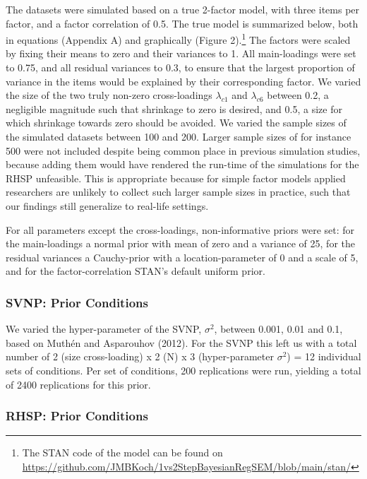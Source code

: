 \documentclass[
  man, donotrepeattitle,floatsintext]{apa6}
\begin{document}
The datasets were simulated based on a true 2-factor model, with three items per factor, and a factor correlation of 0.5. The true model is summarized below, both in equations (Appendix A) and graphically (Figure 2).\footnote{The STAN code of the model can be found on \url{https://github.com/JMBKoch/1vs2StepBayesianRegSEM/blob/main/stan/}} The factors were scaled by fixing their means to zero and their variances to 1. All main-loadings were set to 0.75, and all residual variances to 0.3, to ensure that the largest proportion of variance in the items would be explained by their corresponding factor. We varied the size of the two truly non-zero cross-loadings \(\lambda_{c 1}\) and \(\lambda_{c 6}\) between 0.2, a negligible magnitude such that shrinkage to zero is desired, and 0.5, a size for which shrinkage towards zero should be avoided. We varied the sample sizes of the simulated datasets between 100 and 200. Larger sample sizes of for instance 500 were not included despite being common place in previous simulation studies, because adding them would have rendered the run-time of the simulations for the RHSP unfeasible. This is appropriate because for simple factor models applied researchers are unlikely to collect such larger sample sizes in practice, such that our findings still generalize to real-life settings.

For all parameters except the cross-loadings, non-informative priors were set: for the main-loadings a normal prior with mean of zero and a variance of 25, for the residual variances a Cauchy-prior with a location-parameter of 0 and a scale of 5, and for the factor-correlation STAN's default uniform prior.

\hypertarget{svnp-prior-conditions}{%
\subsubsection{SVNP: Prior Conditions}\label{svnp-prior-conditions}}

We varied the hyper-parameter of the SVNP, \(\sigma^2\), between 0.001, 0.01 and 0.1, based on Muthén and Asparouhov (2012). For the SVNP this left us with a total number of 2 (size cross-loading) x 2 (N) x 3 (hyper-parameter \(\sigma^2\)) = 12 individual sets of conditions. Per set of conditions, 200 replications were run, yielding a total of 2400 replications for this prior.

\hypertarget{rhsp-prior-conditions}{%
\subsubsection{RHSP: Prior Conditions}\label{rhsp-prior-conditions}}
\end{document}
